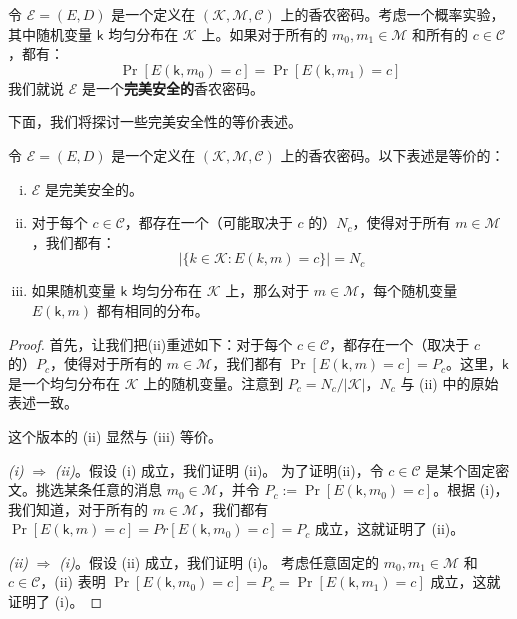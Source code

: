 \begin{definition}[完美安全性]\label{def:2-1}
令 $\mathcal{E}=(E,D)$ 是一个定义在 $(\mathcal{K},\mathcal{M},\mathcal{C})$ 上的香农密码。考虑一个概率实验，其中随机变量 $\boldsymbol{\mathsf{k}}$ 均匀分布在 $\mathcal{K}$ 上。如果对于所有的 $m_0,m_1\in\mathcal{M}$ 和所有的 $c\in\mathcal{C}$，都有：
\[
\Pr[E(\boldsymbol{\mathsf{k}},m_0)=c]=\Pr[E(\boldsymbol{\mathsf{k}},m_1)=c]
\]
我们就说 $\mathcal{E}$ 是一个\textbf{完美安全的}香农密码。
\end{definition}

下面，我们将探讨一些完美安全性的等价表述。

\begin{theorem}\label{theo:2-1}
令 $\mathcal{E}=(E,D)$ 是一个定义在 $(\mathcal{K},\mathcal{M},\mathcal{C})$ 上的香农密码。以下表述是等价的：
\begin{enumerate}[(i)]
	\item $\mathcal{E}$ 是完美安全的。
	\item 对于每个 $c\in\mathcal{C}$，都存在一个（可能取决于 $c$ 的）$N_c$，使得对于所有 $m\in\mathcal{M}$，我们都有：
	\[
    \big\lvert\{k\in\mathcal{K}:E(k,m)=c\}\big\rvert = N_c
    \]
    \item 如果随机变量 $\boldsymbol{\mathsf{k}}$ 均匀分布在 $\mathcal{K}$ 上，那么对于 $m\in\mathcal{M}$，每个随机变量 $E(\boldsymbol{\mathsf{k}},m)$ 都有相同的分布。
\end{enumerate}
\end{theorem}

\begin{proof}
首先，让我们把(ii)重述如下：对于每个 $c\in\mathcal{C}$，都存在一个（取决于 $c$ 的）$P_c$，使得对于所有的 $m\in\mathcal{M}$，我们都有 $\Pr[E(\boldsymbol{\mathsf{k}},m)=c]=P_c$。这里，$\boldsymbol{\mathsf{k}}$ 是一个均匀分布在 $\mathcal{K}$ 上的随机变量。注意到 $P_c=N_c/|\mathcal{K}|$，$N_c$ 与 (ii) 中的原始表述一致。

这个版本的 (ii) 显然与 (iii) 等价。

\vspace{5pt}

\emph{(i)} $\Longrightarrow$ \emph{(ii)}。假设 (i) 成立，我们证明 (ii)。
为了证明(ii)，令 $c\in\mathcal{C}$ 是某个固定密文。挑选某条任意的消息 $m_0\in\mathcal{M}$，并令 $P_c:=\Pr[E(\boldsymbol{\mathsf{k}},m_0)=c]$。根据 (i)，我们知道，对于所有的 $m\in\mathcal{M}$，我们都有 $\Pr[E(\boldsymbol{\mathsf{k}},m)=c]=Pr[E(\boldsymbol{\mathsf{k}},m_0)=c]=P_c$ 成立，这就证明了 (ii)。

\emph{(ii)} $\Longrightarrow$ \emph{(i)}。假设 (ii) 成立，我们证明 (i)。
考虑任意固定的 $m_0,m_1\in\mathcal{M}$ 和 $c\in\mathcal{C}$，(ii) 表明 $\Pr[E(\boldsymbol{\mathsf{k}},m_0)=c]=P_c=\Pr[E(\boldsymbol{\mathsf{k}},m_1)=c]$ 成立，这就证明了 (i)。
\end{proof}


